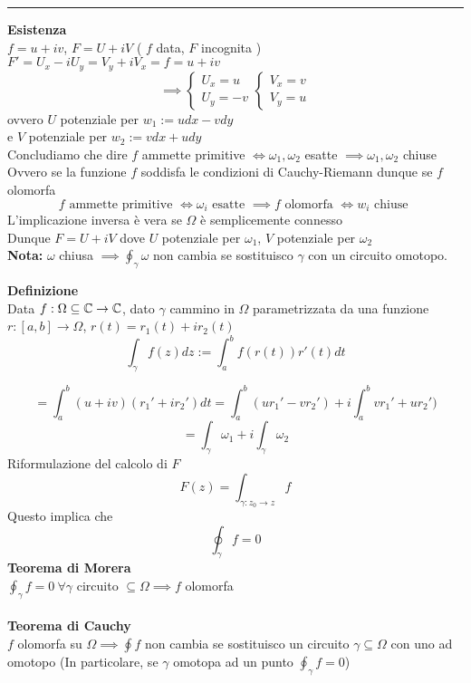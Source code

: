 \noindent\rule{\textwidth}{0.5pt}
\textbf{Esistenza}
\\$f=u+iv$, $F=U+iV$ ( $f$ data, $F$ incognita )
\\$F'=U_x-iU_y=V_y+iV_x=f=u+iv$
\[
	\implies \begin{cases}
	U_x=u\\U_y=-v
\end{cases}
	\begin{cases}
	V_x=v\\V_y=u
\end{cases}
\]
ovvero $U$ potenziale per $w_1:=udx-vdy$
\\e $V$ potenziale per $w_2:=vdx+udy$
\\Concludiamo che dire $f$ ammette primitive $\iff\omega_1,\omega_2$ esatte $\implies\omega_1,\omega_2$ chiuse
\\Ovvero se la funzione $f$ soddisfa le condizioni di Cauchy-Riemann dunque se $f$ olomorfa
\[f\text{ ammette primitive }\iff\omega_i \text{ esatte }\implies f \text{ olomorfa }\iff w_i\text{ chiuse }\]
L'implicazione inversa è vera se $\Omega$ è semplicemente connesso
\\Dunque $F=U+iV$ dove $U$ potenziale per $\omega_1$, $V$ potenziale per $\omega_2$
\\\textbf{Nota: } $\omega$ chiusa $\implies \oint_\gamma \omega$ non cambia se sostituisco $\gamma$ con un circuito omotopo. 
\begin{tcolorbox}
	\textbf{Definizione} 
	\\Data $f:\Omega\subseteq\mathbb{C}\to \mathbb{C}$, dato $\gamma$ cammino in $\Omega$ parametrizzata da una funzione $r:[a,b]\to \Omega$, $r(t)=r_1(t)+ir_2(t)$
	\[\int_{\gamma}^{} f(z)dz:=\int_{a}^{b} f(r(t))r'(t)dt\]

\end{tcolorbox}
	\[=\int_{a}^{b} (u+iv)(r_1'+ir_2')dt=\int_{a}^{b} (ur_1'-vr_2')+i \int_{a}^{b} vr_1'+ur_2')\]
	\[=\int_{\gamma}^{} \omega_1+i \int_{\gamma}^{}\omega_2\]
Riformulazione del calcolo di $F$
\[F(z)=\int_{\gamma:z_0\to z}^{} f \]
Questo implica che \[\oint_\gamma f=0\]
\textbf{Teorema di Morera}
\\ $\oint_\gamma f=0 \ \forall \gamma $ circuito $\subseteq \Omega \implies f$ olomorfa
\\\\\textbf{Teorema di Cauchy}
\\$f$ olomorfa su $\Omega\implies\oint f$ non cambia se sostituisco un circuito $\gamma \subseteq\Omega$ con uno ad omotopo (In particolare, se $\gamma$ omotopa ad un punto $\oint_\gamma f=0$)
